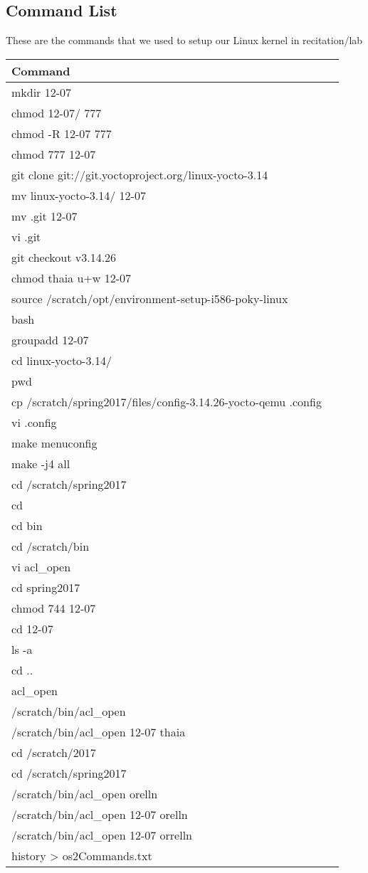 \documentclass[letterpaper, 10pt, notitlepage]{article}
\begin{document}
\subsection{Command List}
These are the commands that we used to setup our Linux kernel in recitation/lab
\begin{center}
\begin{longtable} {|l | c|}
\hline
\bf Command \\ \hline
mkdir 12-07 \\ \hline
chmod 12-07/ 777 \\ \hline
chmod -R 12-07 777 \\ \hline
chmod 777 12-07 \\ \hline
git clone git://git.yoctoproject.org/linux-yocto-3.14 \\ \hline
mv linux-yocto-3.14/ 12-07 \\ \hline
mv .git 12-07 \\ \hline
vi .git \\ \hline
git checkout v3.14.26 \\ \hline
chmod thaia u+w 12-07 \\ \hline
source /scratch/opt/environment-setup-i586-poky-linux \\ \hline
bash \\ \hline
groupadd 12-07 \\ \hline
cd linux-yocto-3.14/ \\ \hline
pwd \\ \hline
cp /scratch/spring2017/files/config-3.14.26-yocto-qemu .config \\ \hline
vi .config \\ \hline
make menuconfig \\ \hline
make -j4 all \\ \hline
cd /scratch/spring2017 \\ \hline
cd \\ \hline
cd bin \\ \hline
cd /scratch/bin \\ \hline
vi acl\_open \\ \hline
cd spring2017 \\ \hline
chmod 744 12-07 \\ \hline
cd 12-07 \\ \hline
ls -a \\ \hline
cd .. \\ \hline
acl\_open \\ \hline
/scratch/bin/acl\_open \\ \hline
/scratch/bin/acl\_open 12-07 thaia \\ \hline
cd /scratch/2017 \\ \hline
cd /scratch/spring2017 \\ \hline
/scratch/bin/acl\_open orelln \\ \hline
/scratch/bin/acl\_open 12-07 orelln \\ \hline
/scratch/bin/acl\_open 12-07 orrelln \\ \hline
history > os2Commands.txt \\ \hline
\end{longtable}
\end{center}
\end{document}
